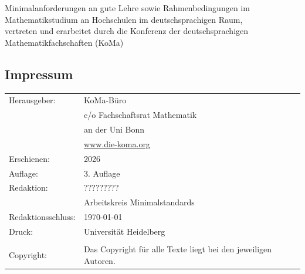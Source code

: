 \newpage
\vspace*{5cm}

\begin{center}
  Minimalanforderungen an gute Lehre sowie Rahmenbedingungen im Mathematikstudium an Hochschulen im deutschsprachigen Raum,\\
  vertreten und erarbeitet durch die Konferenz der deutschsprachigen Mathematikfachschaften (KoMa)
\end{center}

\vfill
\subsection*{Impressum}

\begin{table}[h]
  \footnotesize
  \begin{tabular}{ll}
    Herausgeber: & KoMa-Büro \\
    & c/o Fachschaftsrat Mathematik \\
    & an der Uni Bonn \\
    & \url{www.die-koma.org} \\
    Erschienen:	& 2026 \\
    Auflage: & 3. Auflage \\
    Redaktion: & ????????? \\
    & Arbeitskreis \glqq{}Minimalstandards\grqq{}\\ 
    Redaktionsschluss: & \today \\
    Druck: & Universität Heidelberg \\
    & \\
    Copyright: & Das Copyright für alle Texte liegt bei den jeweiligen Autoren. \\
  \end{tabular}
\end{table}
